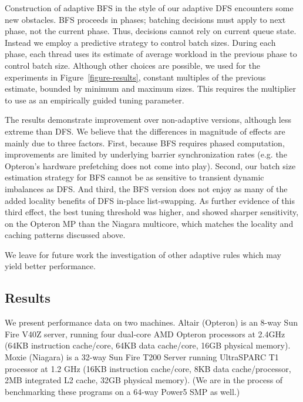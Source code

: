 
Construction of adaptive BFS in the style of our adaptive DFS
encounters some new obstacles.  BFS proceeds in phases; batching
decisions must apply to next phase, not the current phase. Thus,
decisions cannot rely on current queue state.  Instead we employ a
predictive strategy to control batch sizes. During each phase, each
thread uses its estimate of average workload in the previous phase to
control batch size. Although other choices are possible, we used for
the experiments in Figure~\ref{figure-results}, constant multiples of
the previous estimate, bounded by minimum and maximum sizes. This
requires the multiplier to use as an empirically guided tuning
parameter.

The results demonstrate improvement over non-adaptive versions,
although less extreme than DFS.  We believe that the differences in
magnitude of effects are mainly due to three factors. First, because
BFS requires phased computation, improvements are limited by
underlying barrier synchronization rates (e.g.{} the Opteron's hardware
prefetching does not come into play). Second, our batch size
estimation strategy for BFS cannot be as sensitive to transient
dynamic imbalances as DFS.  And third, the BFS version does not enjoy
as many of the added locality benefits of DFS in-place list-swapping.
As further evidence of this third effect, the best tuning threshold
was higher, and showed sharper sensitivity, on the Opteron MP than the
Niagara multicore, which matches the locality and caching patterns
discussed above.

We leave for future work the investigation of other adaptive rules which may yield better performance. 


\subsection{Results}
We present performance data on two machines. Altair (Opteron) is an
8-way Sun Fire V40Z server, running four dual-core AMD Opteron
processors at 2.4GHz (64KB instruction cache/core, 64KB data
cache/core, 16GB physical memory). Moxie (Niagara) is a 32-way Sun
Fire T200 Server running UltraSPARC T1 processor at 1.2 GHz (16KB
instruction cache/core, 8KB data cache/processor, 2MB integrated L2
cache, 32GB physical memory). (We are in the process of benchmarking
these programs on a 64-way Power5 SMP as well.)


